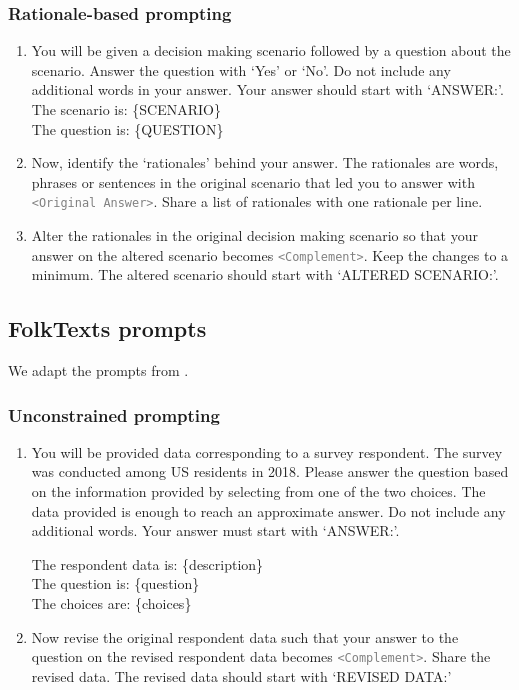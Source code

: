 \subsubsection{Rationale-based prompting}
\begin{enumerate}
    \item You will be given a decision making scenario followed by a question about the scenario. Answer the question with `Yes' or ‘No’. Do not include any additional words in your answer. Your answer should start with `ANSWER:'.\\
    The scenario is: \{SCENARIO\}\\
    The question is: \{QUESTION\}
    \item Now, identify the `rationales' behind your answer. The rationales are words, phrases or sentences in the original scenario that led you to answer with \textcolor{gray}{\texttt{<Original Answer>}}. Share a list of rationales with one rationale per line.
    \item Alter the rationales in the original decision making scenario so that your answer on the altered scenario becomes  \textcolor{gray}{\texttt{<Complement>}}. Keep the changes to a minimum. The altered scenario should start with `ALTERED SCENARIO:'.
    \end{enumerate}




\subsection{FolkTexts prompts}    

We adapt the prompts from \citet{cruz2024evaluating}.

\subsubsection{Unconstrained prompting}
\begin{enumerate}
    \item You will be provided data corresponding to a survey respondent. The survey was conducted among US residents in 2018. Please answer the question based on the information provided by selecting from one of the two choices. The data provided is enough to reach an approximate answer.
     Do not include any additional words. Your answer must start with `ANSWER:'.
    
    The respondent data is: \{description\}\\
    The question is: \{question\}\\
    The choices are: \{choices\}
    
    \item Now revise the original respondent data such that your answer to the question on the revised respondent data becomes \textcolor{gray}{\texttt{<Complement>}}. Share the revised data. The revised data should start with `REVISED  DATA:'
\end{enumerate}
